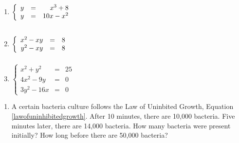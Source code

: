 \begin{multicols}{3}
\begin{enumerate}
\setcounter{enumi}{\value{HW}}

\item $\left\{\begin{array}{rcr}  y & = & x^{3} + 8 \\ y & = & 10x - x^{2} \\ \end{array} \right. \vphantom{\left\{\begin{array}{rcr}  x^{2} + y^{2} & = & 25 \\ 4x^{2} - 9y & = & 0 \\ 3y^{2} - 16x & = & 0\end{array} \right.}$

\item $\left\{\begin{array}{rcr}  x^2 - xy & = & 8 \\  y^2 - xy & = & 8 \\ \end{array} \right. \vphantom{\left\{\begin{array}{rcr}  x^{2} + y^{2} & = & 25 \\ 4x^{2} - 9y & = & 0 \\ 3y^{2} - 16x & = & 0\end{array} \right.}$

\item $\left\{\begin{array}{rcr}  x^{2} + y^{2} & = & 25 \\ 4x^{2} - 9y & = & 0 \\ 3y^{2} - 16x & = & 0\end{array} \right.$ \label{solveninlin2last}

\setcounter{HW}{\value{enumi}}
\end{enumerate}
\end{multicols}

\begin{enumerate}
\setcounter{enumi}{\value{HW}}

\item  A certain bacteria culture follows the Law of Uninbited Growth, Equation \ref{lawofuninhibitedgrowth}.  After 10 minutes, there are 10,000 bacteria. Five minutes later, there are 14,000 bacteria.  How many bacteria were present initially?  How long before there are 50,000 bacteria?


\setcounter{HW}{\value{enumi}}
\end{enumerate}


